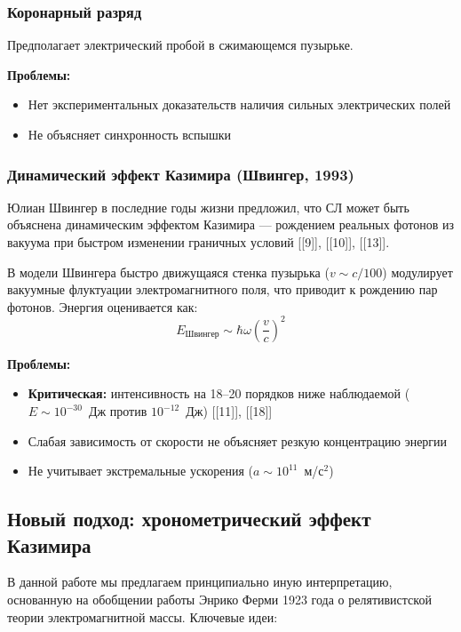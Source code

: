 \documentclass[12pt,a4paper]{article}
\begin{document}
\subsubsection{Коронарный разряд}
Предполагает электрический пробой в сжимающемся пузырьке.

\textbf{Проблемы:}
\begin{itemize}
    \item Нет экспериментальных доказательств наличия сильных электрических полей
    \item Не объясняет синхронность вспышки
\end{itemize}

\subsubsection{Динамический эффект Казимира (Швингер, 1993)}
Юлиан Швингер в последние годы жизни предложил, что СЛ может быть объяснена динамическим эффектом Казимира — рождением реальных фотонов из вакуума при быстром изменении граничных условий [[9]], [[10]], [[13]].

В модели Швингера быстро движущаяся стенка пузырька ($v \sim c/100$) модулирует вакуумные флуктуации электромагнитного поля, что приводит к рождению пар фотонов. Энергия оценивается как:
\begin{equation}
E_{\text{Швингер}} \sim \hbar\omega \left(\frac{v}{c}\right)^2
\end{equation}

\textbf{Проблемы:}
\begin{itemize}
    \item \textbf{Критическая:} интенсивность на 18--20 порядков ниже наблюдаемой ($E \sim 10^{-30}$~Дж против $10^{-12}$~Дж) [[11]], [[18]]
    \item Слабая зависимость от скорости не объясняет резкую концентрацию энергии
    \item Не учитывает экстремальные ускорения ($a \sim 10^{11}$~м/с$^2$)
\end{itemize}

\subsection{Новый подход: хронометрический эффект Казимира}

В данной работе мы предлагаем принципиально иную интерпретацию, основанную на обобщении работы Энрико Ферми 1923 года о релятивистской теории электромагнитной массы. Ключевые идеи:
\end{document}
